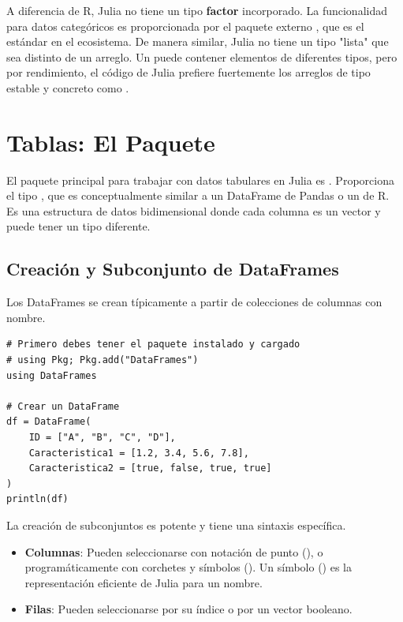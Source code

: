 \begin{remark}
A diferencia de R, Julia no tiene un tipo \textbf{factor} incorporado. La funcionalidad para datos categóricos es proporcionada por el paquete externo \textbf{}, que es el estándar en el ecosistema. De manera similar, Julia no tiene un tipo "lista" que sea distinto de un arreglo. Un  puede contener elementos de diferentes tipos, pero por rendimiento, el código de Julia prefiere fuertemente los arreglos de tipo estable y concreto como .
\end{remark}

\section{Tablas: El Paquete }
\label{sec:julia_dataframes}
El paquete principal para trabajar con datos tabulares en Julia es \textbf{}. Proporciona el tipo , que es conceptualmente similar a un DataFrame de Pandas o un  de R. Es una estructura de datos bidimensional donde cada columna es un vector y puede tener un tipo diferente.

\subsection*{Creación y Subconjunto de DataFrames}
Los DataFrames se crean típicamente a partir de colecciones de columnas con nombre.

\begin{example}
\text{ }\begin{verbatim}
# Primero debes tener el paquete instalado y cargado
# using Pkg; Pkg.add("DataFrames")
using DataFrames

# Crear un DataFrame
df = DataFrame(
    ID = ["A", "B", "C", "D"],
    Caracteristica1 = [1.2, 3.4, 5.6, 7.8],
    Caracteristica2 = [true, false, true, true]
)
println(df)
\end{verbatim}
\end{example}

La creación de subconjuntos es potente y tiene una sintaxis específica.
\begin{itemize}
    \item \textbf{Columnas}: Pueden seleccionarse con notación de punto (), o programáticamente con corchetes y símbolos (). Un símbolo () es la representación eficiente de Julia para un nombre.
    \item \textbf{Filas}: Pueden seleccionarse por su índice o por un vector booleano.
\end{itemize}

